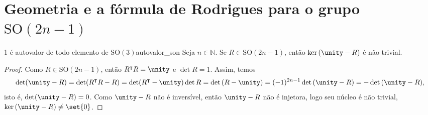 \section[Geometria e a fórmula de Rodrigues para o grupo SO(3)]{Geometria e a fórmula de Rodrigues para o grupo \(\mathrm{SO}(2n - 1)\)}
\begin{lemma}{1 é autovalor de todo elemento de \(\mathrm{SO}(3)\)}{autovalor_son}
    Seja \(n \in \mathbb{N}\). Se \(R \in \mathrm{SO}(2n - 1)\), então \(\ker{(\unity - R)}\) é não trivial.
\end{lemma}
\begin{proof}
    Como \(R \in \mathrm{SO}(2n - 1)\), então \(R^\intercal R = \unity\) e \(\det{R} = 1\). Assim, temos
    \begin{equation*}
        \det(\unity - R) = \det(R^\intercal R - R) = \det(R^\intercal -\unity)\det{R} = \det{(R-\unity)} = (-1)^{2n - 1}\det{(\unity - R)} = -\det{(\unity - R)},
    \end{equation*}
    isto é, \(\det(\unity - R) = 0\). Como \(\unity - R\) não é inversível, então \(\unity - R\) não é injetora, logo seu núcleo é não trivial, \(\ker{(\unity - R)} \neq \set{0}\).
\end{proof}

